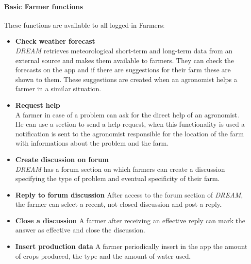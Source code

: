 \paragraph{Basic Farmer functions} These functions are available to all logged-in Farmers:
\begin{itemize}
    \item \textbf{Check weather forecast}\\
          \emph{DREAM} retrieves meteorological short-term and long-term data from an external source and makes them available 
          to farmers. They can check the forecasts on the app and if there are suggestions for their farm these are shown to them.
           These suggestions are created when an agronomist helps a farmer in a similar situation.
    \item \textbf{Request help}\\
          A farmer in case of a problem can ask for the direct help of an agronomist. He can use a section to send a help request,
           when this functionality is used a notification is sent to the agronomist responsible for the location of the farm with informations about the problem and the farm.
    \item \textbf{Create discussion on forum}\\
         \emph{DREAM} has a forum section on which farmers can create a discussion specifying the type of problem and eventual specificity of their farm. 
    \item \textbf{Reply to forum discussion}
        After access to the forum section of \emph{DREAM}, the farmer can select a recent, not closed discussion and post a reply.
    \item \textbf{Close a discussion}
        A farmer after receiving an effective reply can mark the answer as effective and close the discussion.
    \item \textbf{Insert production data}
    A farmer periodically insert in the app the amount of crops produced, the type and the amount of water used.
\end{itemize}

